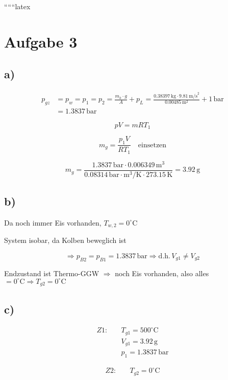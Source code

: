 
``````latex


\section*{Aufgabe 3}

\subsection*{a)}
\begin{align*}
    p_{gz} &= p_{w} = p_{1} = p_{2} = \frac{m_{k} \cdot g}{A} + p_{L} = \frac{0.38397 \, \text{kg} \cdot 9.81 \, \text{m/s}^2}{0.00485 \, \text{m}^2} + 1 \, \text{bar} \\
    &= 1.3837 \, \text{bar}
\end{align*}

\[
pV = mRT_{1}
\]

\[
m_{g} = \frac{p_{1}V}{RT_{1}} \quad \text{einsetzen}
\]

\[
m_{g} = \frac{1.3837 \, \text{bar} \cdot 0.006349 \, \text{m}^3}{0.08314 \, \text{bar} \cdot \text{m}^3/\text{K} \cdot 273.15 \, \text{K}} = 3.92 \, \text{g}
\]

\subsection*{b)}
Da noch immer Eis vorhanden, $T_{w,2} = 0^\circ \text{C}$

System isobar, da Kolben beweglich ist

\[
\Rightarrow p_{B2} = p_{B1} = 1.3837 \, \text{bar} \Rightarrow \text{d.h.} \, V_{g1} \neq V_{g2}
\]

Endzustand ist Thermo-GGW $\Rightarrow$ noch Eis vorhanden, also alles $= 0^\circ \text{C} \Rightarrow T_{g2} = 0^\circ \text{C}$

\subsection*{c)}
\begin{align*}
    Z1: & \quad T_{g1} = 500^\circ \text{C} \\
    & \quad V_{g1} = 3.92 \, \text{g} \\
    & \quad p_{1} = 1.3837 \, \text{bar}
\end{align*}

\begin{align*}
    Z2: & \quad T_{g2} = 0^\circ \text{C}
\end{align*}

